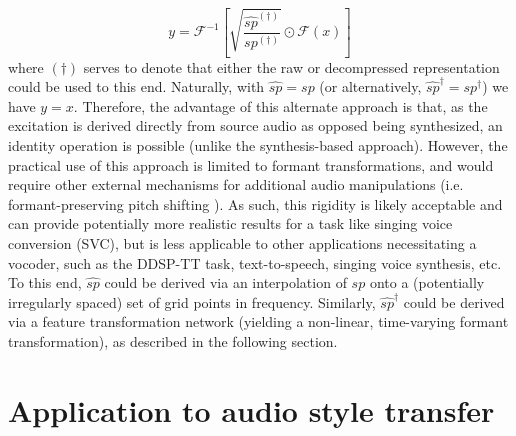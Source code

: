 \documentclass{article}
\begin{document}
\begin{sloppy}
\begin{equation}
\label{eqn:formant}
y = \mathcal{F}^{-1}\left[\sqrt{\frac{\hat{sp}^{(\dagger)}}{sp^{(\dagger)}}}\odot\mathcal{F}(x)\right]
\end{equation}
where $(\dagger)$ serves to denote that either the raw or decompressed representation could be used to this end.  Naturally, with $\hat{sp}=sp$ (or alternatively, $\hat{sp}^\dagger=sp^\dagger$) we have $y = x$.  Therefore, the advantage of this alternate approach is that, as the excitation is derived directly from source audio as opposed being synthesized, an identity operation is possible (unlike the synthesis-based approach).  However, the practical use of this approach is limited to formant transformations, and would require other external mechanisms for additional audio manipulations (i.e. formant-preserving pitch shifting \cite{Lent}).  As such, this rigidity is likely acceptable and can provide potentially more realistic results for a task like singing voice conversion (SVC), but is less applicable to other applications necessitating a vocoder, such as the DDSP-TT task, text-to-speech, singing voice synthesis, etc.  To this end, $\hat{sp}$ could be derived via an interpolation of $sp$ onto a (potentially irregularly spaced) set of grid points in frequency.  Similarly, $\hat{sp}^\dagger$ could be derived via a feature transformation network (yielding a non-linear, time-varying formant transformation), as described in the following section.

\section{Application to audio style transfer}
\label{sec:e2e}


\end{sloppy}
\end{document}
